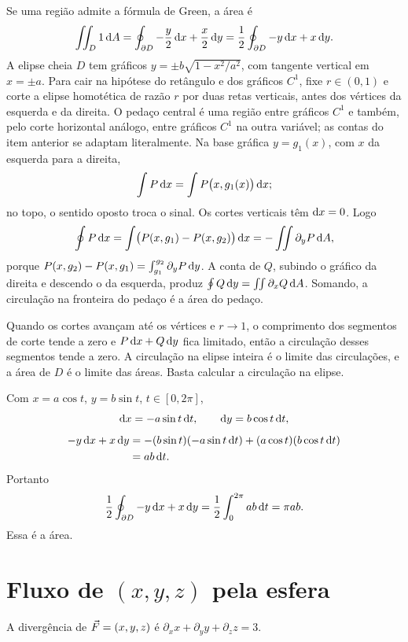 \documentclass[11pt,a4paper]{article}
\begin{document}
Se uma região admite a fórmula de Green, a área é
\[
\iint_D 1\,\mathrm{d} A=\oint_{\partial D} -\frac y2\,\mathrm{d} x+\frac x2\,\mathrm{d} y
=\frac12\oint_{\partial D}-y\,\mathrm{d} x+x\,\mathrm{d} y.
\]
A elipse cheia $D$ tem gráficos $y=\pm b\sqrt{1-x^2/a^2}$, com tangente vertical em $x=\pm a$. Para cair na hipótese do retângulo e dos gráficos $C^1$, fixe $r\in(0,1)$ e corte a elipse homotética de razão $r$ por duas retas verticais, antes dos vértices da esquerda e da direita. O pedaço central é uma região entre gráficos $C^1$ e também, pelo corte horizontal análogo, entre gráficos $C^1$ na outra variável; as contas do item anterior se adaptam literalmente. Na base gráfica $y=g_1(x)$, com $x$ da esquerda para a direita,
\[
\int P\,\mathrm{d} x=\int P\bigl(x,g_1(x)\bigr)\,\mathrm{d} x;
\]
no topo, o sentido oposto troca o sinal. Os cortes verticais têm $\mathrm{d} x=0$. Logo
\[
\oint P\,\mathrm{d} x
=\int\bigl(P(x,g_1)-P(x,g_2)\bigr)\,\mathrm{d} x
=-\iint\partial_y P\,\mathrm{d} A,
\]
porque $P(x,g_2)-P(x,g_1)=\int_{g_1}^{g_2}\partial_y P\,\mathrm{d} y$. A conta de $Q$, subindo o gráfico da direita e descendo o da esquerda, produz $\oint Q\,\mathrm{d} y=\iint\partial_x Q\,\mathrm{d} A$. Somando, a circulação na fronteira do pedaço é a área do pedaço.

Quando os cortes avançam até os vértices e $r\to 1$, o comprimento dos segmentos de corte tende a zero e $P\,\mathrm{d} x+Q\,\mathrm{d} y$ fica limitado, então a circulação desses segmentos tende a zero. A circulação na elipse inteira é o limite das circulações, e a área de $D$ é o limite das áreas. Basta calcular a circulação na elipse.

Com $x=a\cos t$, $y=b\sin t$, $t\in[0,2\pi]$,
\[
\mathrm{d} x=-a\sin t\,\mathrm{d} t,\qquad\mathrm{d} y=b\cos t\,\mathrm{d} t,
\]
\begin{align*}
-y\,\mathrm{d} x+x\,\mathrm{d} y
&=-(b\sin t)(-a\sin t\,\mathrm{d} t)+(a\cos t)(b\cos t\,\mathrm{d} t)\\
&=ab\,\mathrm{d} t.
\end{align*}
Portanto
\[
\frac12\oint_{\partial D}-y\,\mathrm{d} x+x\,\mathrm{d} y
=\frac12\int_0^{2\pi} ab\,\mathrm{d} t
=\pi ab.
\]
Essa é a área.

\section{Fluxo de $(x,y,z)$ pela esfera}

A divergência de $\vec{F}=(x,y,z)$ é $\partial_x x+\partial_y y+\partial_z z=3$.
\end{document}
